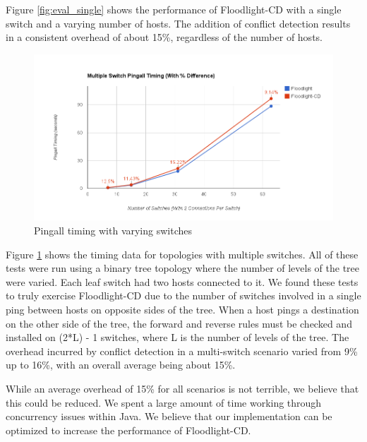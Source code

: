 Figure \ref{fig:eval_single} shows the performance of Floodlight-CD with a single switch and a varying number of hosts.
The addition of conflict detection results in a consistent overhead of about 15\%, regardless of the number of hosts.

\begin{figure}[ht!]
	\begin{center}
		\includegraphics[scale=.5]{figs/multiSwitch_eval.png}
		\caption{Pingall timing with varying switches}
		\label{fig:eval_multi}
	\end{center}
\end{figure}

Figure \ref{fig:eval_multi} shows the timing data for topologies with multiple switches.
All of these tests were run using a binary tree topology where the number of levels of the tree were varied.
Each leaf switch had two hosts connected to it.
We found these tests to truly exercise Floodlight-CD due to the number of switches involved in a single ping between hosts on opposite sides of the tree.
When a host pings a destination on the other side of the tree, the forward and reverse rules must be checked and installed on (2*L) - 1 switches, where L is the number of levels of the tree. 
The overhead incurred by conflict detection in a multi-switch scenario varied from 9\% up to 16\%, with an overall average being about 15\%.

While an average overhead of 15\% for all scenarios is not terrible, we believe that this could be reduced.
We spent a large amount of time working through concurrency issues within Java.
We believe that our implementation can be optimized to increase the performance of Floodlight-CD.

